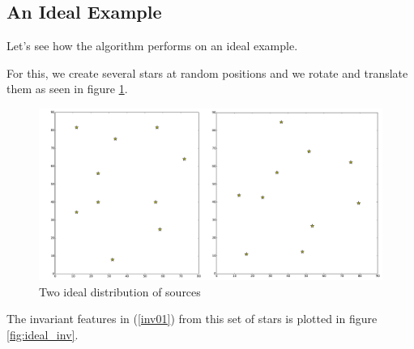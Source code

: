 



\subsection{An Ideal Example}

Let's see how the algorithm performs on an ideal example.

For this, we create several stars at random positions and we rotate and translate them as seen in figure \ref{fig:ideal_sources}.

\begin{figure}[htbp]
   \centering
   \includegraphics[width = \linewidth]{chapter_astroalign/figures/idealSources.pdf}
   \caption{Two ideal distribution of sources}
   \label{fig:ideal_sources}
\end{figure}

The invariant features in (\ref{inv01}) from this set of stars is plotted in figure \ref{fig:ideal_inv}.

